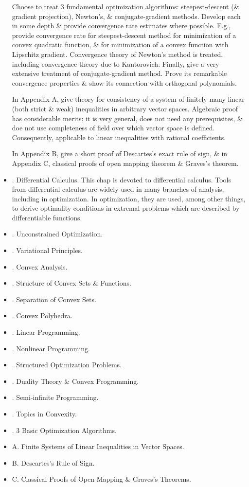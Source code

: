 \documentclass{article}
\begin{document}
\begin{itemize}
    Choose to treat 3 fundamental optimization algorithms: steepest-descent (\& gradient projection), Newton's, \& conjugate-gradient methods. Develop each in some depth \& provide convergence rate estimates where possible. E.g., provide convergence rate for steepest-descent method for minimization of a convex quadratic function, \& for minimization of a convex function with Lipschitz gradient. Convergence theory of Newton's method is treated, including convergence theory due to {\sc Kantorovich}. Finally, give a very extensive treatment of conjugate-gradient method. Prove its remarkable convergence properties \& show its connection with orthogonal polynomials.
    
    In Appendix A, give theory for consistency of a system of finitely many linear (both strict \& weak) inequalities in arbitrary vector spaces. Algebraic proof has considerable merits: it is very general, does not need any prerequisites, \& doe not use completeness of field over which vector space is defined. Consequently, applicable to linear inequalities with rational coefficients.
    
    In Appendix B, give a short proof of Descartes's exact rule of sign, \& in Appendix C, classical proofs of open mapping theorem \& Graves's theorem.
    \item {. Differential Calculus.} This chap is devoted to differential calculus. Tools from differential calculus are widely used in many branches of analysis, including in optimization. In optimization, they are used, among other things, to derive optimality conditions in extremal problems which are described by differentiable functions.
    
    \item {. Unconstrained Optimization.}
    \item {. Variational Principles.}
    \item {. Convex Analysis.}
    \item {. Structure of Convex Sets \& Functions.}
    \item {. Separation of Convex Sets.}
    \item {. Convex Polyhedra.}
    \item {. Linear Programming.}
    \item {. Nonlinear Programming.}
    \item {. Structured Optimization Problems.}
    \item {. Duality Theory \& Convex Programming.}
    \item {. Semi-infinite Programming.}
    \item {. Topics in Convexity.}
    \item {. 3 Basic Optimization Algorithms.}
    \item {\sf A. Finite Systems of Linear Inequalities in Vector Spaces.}
    \item {\sf B. Descartes's Rule of Sign.}
    \item {\sf C. Classical Proofs of Open Mapping \& Graves's Theorems.}
\end{itemize}
\end{document}
